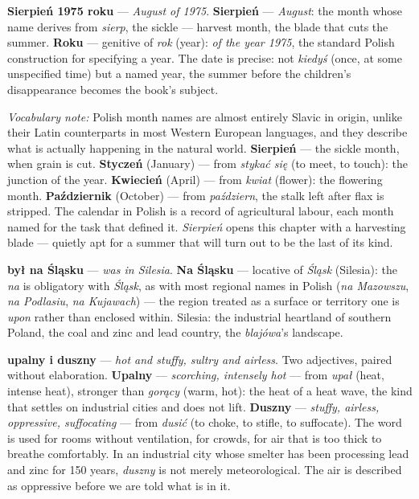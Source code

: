 \textbf{Sierpień 1975 roku} --- \textit{August of
1975}. \textbf{Sierpień} --- \textit{August}: the
month whose name derives from \textit{sierp}, the
sickle --- harvest month, the blade that cuts the
summer. \textbf{Roku} --- genitive of \textit{rok}
(year): \textit{of the year 1975}, the standard
Polish construction for specifying a year. The date
is precise: not \textit{kiedyś} (once, at some
unspecified time) but a named year, the summer before
the children's disappearance becomes the book's
subject.

\medskip
\noindent\textit{Vocabulary note:} Polish month names
are almost entirely Slavic in origin, unlike their
Latin counterparts in most Western European languages,
and they describe what is actually happening in the
natural world. \textbf{Sierpień} --- the sickle month,
when grain is cut. \textbf{Styczeń} (January) ---
from \textit{stykać się} (to meet, to touch): the
junction of the year. \textbf{Kwiecień} (April) ---
from \textit{kwiat} (flower): the flowering month.
\textbf{Październik} (October) --- from
\textit{październ}, the stalk left after flax is
stripped. The calendar in Polish is a record of
agricultural labour, each month named for the task
that defined it. \textit{Sierpień} opens this chapter
with a harvesting blade --- quietly apt for a summer
that will turn out to be the last of its kind.

\textbf{był na Śląsku} --- \textit{was in Silesia}.
\textbf{Na Śląsku} --- locative of \textit{Śląsk}
(Silesia): the \textit{na} is obligatory with
\textit{Śląsk}, as with most regional names in Polish
(\textit{na Mazowszu}, \textit{na Podlasiu},
\textit{na Kujawach}) --- the region treated as a
surface or territory one is \textit{upon} rather
than enclosed within. Silesia: the industrial
heartland of southern Poland, the coal and zinc
and lead country, the \textit{blajówa}'s landscape.

\textbf{upalny i duszny} --- \textit{hot and stuffy,
sultry and airless}. Two adjectives, paired without
elaboration. \textbf{Upalny} --- \textit{scorching,
intensely hot} --- from \textit{upał} (heat, intense
heat), stronger than \textit{gorący} (warm, hot):
the heat of a heat wave, the kind that settles on
industrial cities and does not lift. \textbf{Duszny}
--- \textit{stuffy, airless, oppressive, suffocating}
--- from \textit{dusić} (to choke, to stifle, to
suffocate). The word is used for rooms without
ventilation, for crowds, for air that is too thick
to breathe comfortably. In an industrial city whose
smelter has been processing lead and zinc for 150
years, \textit{duszny} is not merely meteorological.
The air is described as oppressive before we are told
what is in it.

